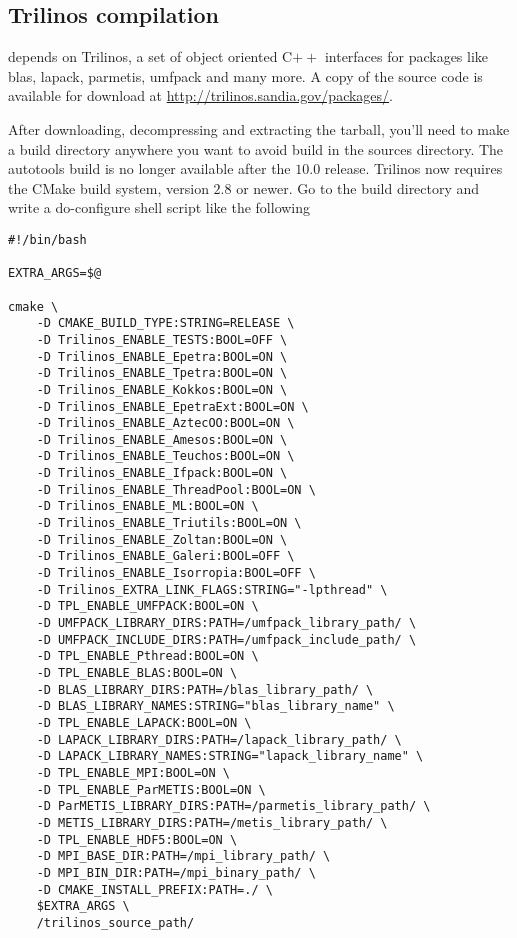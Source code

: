 \subsection{Trilinos compilation}
\lifev depends on Trilinos, a set of object oriented C$++$ interfaces for packages like 
blas, lapack, parmetis, umfpack and many more. A copy of the source
code is available for download at \url{http://trilinos.sandia.gov/packages/}. 

After downloading, decompressing and extracting the tarball, you'll need to 
make a build directory anywhere you want to avoid build in the sources directory. 
The autotools build is no longer available after the $10.0$ release. 
Trilinos now requires the CMake 
build system, version $2.8$ or newer. 
Go to the build directory and write a do-configure shell script like the following


\begin{verbatim}
#!/bin/bash

EXTRA_ARGS=$@

cmake \
    -D CMAKE_BUILD_TYPE:STRING=RELEASE \
    -D Trilinos_ENABLE_TESTS:BOOL=OFF \
    -D Trilinos_ENABLE_Epetra:BOOL=ON \
    -D Trilinos_ENABLE_Tpetra:BOOL=ON \
    -D Trilinos_ENABLE_Kokkos:BOOL=ON \
    -D Trilinos_ENABLE_EpetraExt:BOOL=ON \
    -D Trilinos_ENABLE_AztecOO:BOOL=ON \
    -D Trilinos_ENABLE_Amesos:BOOL=ON \
    -D Trilinos_ENABLE_Teuchos:BOOL=ON \
    -D Trilinos_ENABLE_Ifpack:BOOL=ON \
    -D Trilinos_ENABLE_ThreadPool:BOOL=ON \
    -D Trilinos_ENABLE_ML:BOOL=ON \
    -D Trilinos_ENABLE_Triutils:BOOL=ON \
    -D Trilinos_ENABLE_Zoltan:BOOL=ON \
    -D Trilinos_ENABLE_Galeri:BOOL=OFF \
    -D Trilinos_ENABLE_Isorropia:BOOL=OFF \
    -D Trilinos_EXTRA_LINK_FLAGS:STRING="-lpthread" \
    -D TPL_ENABLE_UMFPACK:BOOL=ON \
    -D UMFPACK_LIBRARY_DIRS:PATH=/umfpack_library_path/ \
    -D UMFPACK_INCLUDE_DIRS:PATH=/umfpack_include_path/ \
    -D TPL_ENABLE_Pthread:BOOL=ON \
    -D TPL_ENABLE_BLAS:BOOL=ON \
    -D BLAS_LIBRARY_DIRS:PATH=/blas_library_path/ \
    -D BLAS_LIBRARY_NAMES:STRING="blas_library_name" \
    -D TPL_ENABLE_LAPACK:BOOL=ON \
    -D LAPACK_LIBRARY_DIRS:PATH=/lapack_library_path/ \
    -D LAPACK_LIBRARY_NAMES:STRING="lapack_library_name" \
    -D TPL_ENABLE_MPI:BOOL=ON \
    -D TPL_ENABLE_ParMETIS:BOOL=ON \
    -D ParMETIS_LIBRARY_DIRS:PATH=/parmetis_library_path/ \
    -D METIS_LIBRARY_DIRS:PATH=/metis_library_path/ \
    -D TPL_ENABLE_HDF5:BOOL=ON \
    -D MPI_BASE_DIR:PATH=/mpi_library_path/ \
    -D MPI_BIN_DIR:PATH=/mpi_binary_path/ \
    -D CMAKE_INSTALL_PREFIX:PATH=./ \
    $EXTRA_ARGS \
    /trilinos_source_path/
\end{verbatim}

